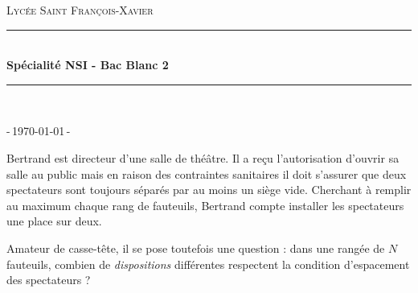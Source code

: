 \documentclass[a4paper, 11pt]{article}
\begin{document}
\begin{titlepage}
	\newcommand{\HRule}{\rule{\linewidth}{0.5mm}}
	
	\center
	
	\textsc{\large Lycée Saint François-Xavier}\\[0.5cm]
	
	\vfill
	
	\HRule\\[0.5cm]
	
	{\huge\bfseries Spécialité NSI - Bac Blanc 2}
	
	\HRule\\[0.5cm]

	\vfill
	
	\begin{center}
	\end{center}
				
	\vfill


	\vspace{0.5cm}

	
	\vfill\vfill
	
	{\large -\,\today\,-}
	
\end{titlepage}

{\large{}}

Bertrand est directeur d'une salle de théâtre. Il a reçu l'autorisation d'ouvrir sa salle au public mais en raison 
des contraintes sanitaires il doit s'assurer que deux spectateurs sont toujours séparés par au moins un siège vide.
Cherchant à remplir au maximum chaque rang de fauteuils, Bertrand compte installer les spectateurs une place sur deux.

Amateur de casse-tête, il se pose toutefois une question : dans une rangée de $N$ fauteuils, combien de \textit{dispositions} différentes respectent la condition d'espacement des spectateurs ?
\end{document}
